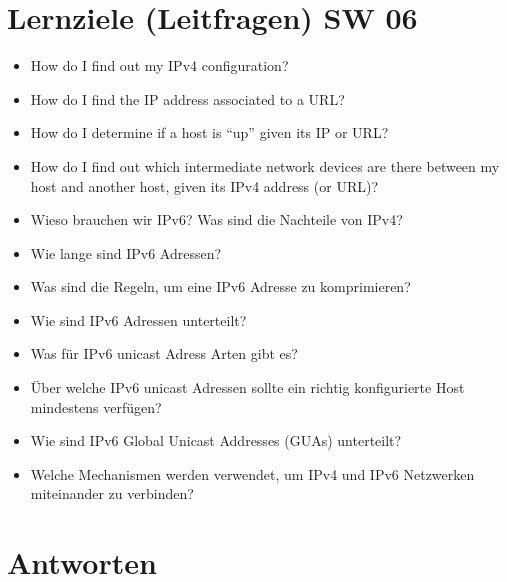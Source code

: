 \section{Lernziele (Leitfragen) SW 06}
\begin{itemize}
    \item How do I find out my IPv4 configuration?
    \item How do I find the IP address associated to a URL?
    \item How do I determine if a host is “up” given its IP or URL?
    \item How do I find out which intermediate network devices are there between my host and another host, given its IPv4 address (or URL)?
    \item Wieso brauchen wir IPv6? Was sind die Nachteile von IPv4?
    \item Wie lange sind IPv6 Adressen?
    \item Was sind die Regeln, um eine IPv6 Adresse zu komprimieren?
    \item Wie sind IPv6 Adressen unterteilt?
    \item Was für IPv6 unicast Adress Arten gibt es?
    \item Über welche IPv6 unicast Adressen sollte ein richtig konfigurierte Host mindestens verfügen?
    \item Wie sind IPv6 Global Unicast Addresses (GUAs) unterteilt?
    \item Welche Mechanismen werden verwendet, um IPv4 und IPv6 Netzwerken miteinander zu verbinden?
\end{itemize}

\section{Antworten}
